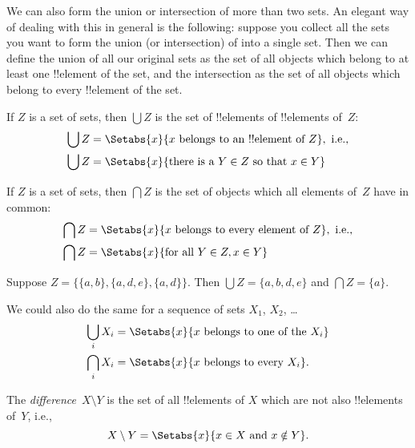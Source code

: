 \documentclass[../../../include/open-logic-section]{subfiles}
\begin{document}
\begin{explain}
We can also form the union or intersection of more than two
sets. An elegant way of dealing with this in general is the
following: suppose you collect all the sets you want to form the union
(or intersection) of into a single set. Then we can define the union
of all our original sets as the set of all objects which belong to at
least one !!{element} of the set, and the intersection as the set of
all objects which belong to every !!{element} of the set.
\end{explain}

\begin{defn}
If $Z$ is a set of sets, then $\bigcup Z$ is the set of !!{element}s of
!!{element}s of~$Z$:
\begin{align*}
\bigcup Z & = \Setabs{x}{x \text{ belongs to an !!{element} of } Z},
\text{ i.e.,}\\
\bigcup Z & = \Setabs{x}{\text{there is a } Y \in Z
  \text{ so that } x \in Y}
\end{align*}
\end{defn}

\begin{defn}
If $Z$ is a set of sets, then $\bigcap Z$ is the set of objects which
all elements of~$Z$ have in common:
\begin{align*}
\bigcap Z & = \Setabs{x}{x \text{ belongs to every element of } Z},
\text{ i.e.,}\\
\bigcap Z & = \Setabs{x}{\text{for all } Y \in Z, x \in Y}
\end{align*}
\end{defn}

\begin{ex}
Suppose $Z = \{ \{ a, b \}, \{ a, d, e \}, \{ a, d \} \}$.
Then $\bigcup Z = \{ a, b, d, e \}$ and $\bigcap Z = \{ a \}$.
\end{ex}

We could also do the same for a sequence of sets $X_1$, $X_2$, \dots
\begin{align*}
\bigcup_i X_i & = \Setabs{x}{x \text{ belongs to one of the } X_i}\\
\bigcap_i X_i & = \Setabs{x}{x \text{ belongs to every } X_i}.
\end{align*}

\begin{defn}[Difference]
The \emph{difference}~$X \setminus Y$ is the set of all !!{element}s of
$X$ which are not also !!{element}s of~$Y$, i.e.,
\[
X\setminus Y = \Setabs{x}{x\in X \text{ and } x \notin Y}.
\]
\end{defn}
\end{document}
